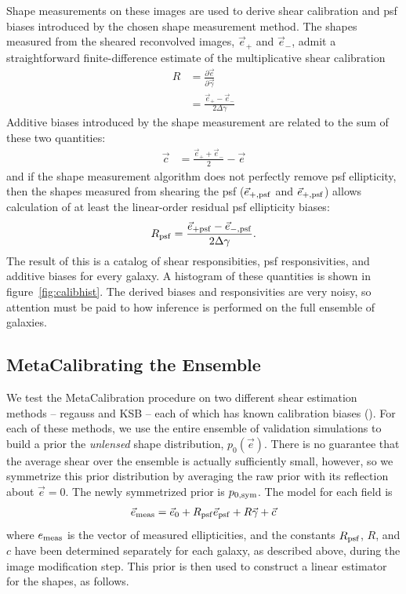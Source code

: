 \documentclass[iop]{emulateapj}
\begin{document}
Shape measurements on these images are used to derive shear
calibration and psf biases {introduced by the chosen shape measurement
  method}. The shapes measured from the sheared reconvolved images,
$\vec{e}_{+}$ and $\vec{e}_{-}$, admit a straightforward
finite-difference estimate of the multiplicative shear calibration
\begin{align}
R &= \frac{\partial \vec{e}}{\partial \vec{\gamma}}  \\
 &=\frac{\vec{e}_{+} - \vec{e}_{-}}{2\Delta\gamma}
\end{align}
Additive biases introduced by the shape measurement are related to the sum of these two quantities:
\begin{align}
\vec{c} &= \frac{\vec{e}_{+} + \vec{e}_{-}}{2} - \vec{e}
\end{align}
and if the shape measurement algorithm does not perfectly remove psf
ellipticity, then the shapes measured from shearing the psf
($\vec{e}_{+,\rm psf}$ and $\vec{e}_{+,\rm psf}$) allows calculation
of at least the linear-order residual psf ellipticity biases:
\begin{align}
R_{\rm psf} = \frac{\vec{e}_{+\rm psf} - \vec{e}_{-,\rm psf}}{2\Delta\gamma}.
\end{align}
The result of this is a catalog of shear responsibities, psf
responsivities, and additive biases for every galaxy. A histogram of
these quantities is shown in figure~\ref{fig:calibhist}. The derived
biases and responsivities are very noisy, so attention must be paid to
how inference is performed on the full ensemble of galaxies.






\subsection{MetaCalibrating the Ensemble}
We test the MetaCalibration procedure on two different shear
estimation methods -- {\sc regauss} and {\sc KSB} -- each of which has
known calibration biases (). For each of these
methods, we use the entire ensemble of validation simulations to build
a prior the {\it unlensed} shape distribution, $p_0(\vec{e})$. There
is no guarantee that the average shear over the ensemble is actually
sufficiently small, however, so we symmetrize this prior distribution
by averaging the raw prior with its reflection about $\vec{e}=0$. The
newly symmetrized prior is $p_{0,\rm sym}$. The model for each field
is
\begin{align}
\vec{e}_{\rm meas} = \vec{e}_{0} + R_{\rm psf} \vec{e}_{\rm psf} + R\vec{\gamma} + \vec{c}
\label{eqn:edist_model}
\end{align}
where $e_{\rm meas}$ is the vector of measured ellipticities, and the
constants $R_{\rm psf}$, $R$, and $c$ have been determined separately
for each galaxy, as described above, during the image modification
step. This prior is then used to construct a linear estimator for the
shapes, as follows.
\end{document}
